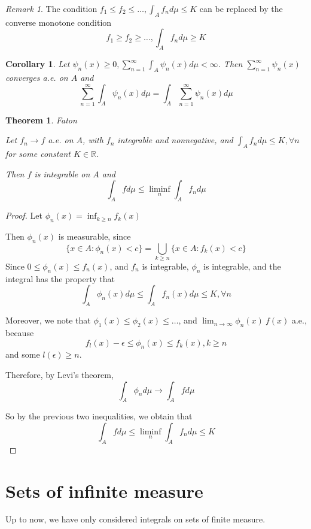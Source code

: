 \documentclass[11pt,a4paper]{report}
\newtheorem{corollary}[theorem]{Corollary}
\theoremstyle{plain}
\newtheorem{thm}{Theorem}[section]
\theoremstyle{definition}
\theoremstyle{remark}
\newtheorem*{rem}{Remark}
\newcommand{\Union}{\bigcup}
\newcommand{\R}{\mathbb{R}}
\begin{document}
\begin{rem}
    The condition $f_1 \le f_2 \le \dots, \int_A f_n d\mu \le K$ can be replaced by the converse monotone condition
    $$ f_1 \ge f_2 \ge \dots, \int_A f_n d\mu \ge K $$
\end{rem}

\begin{corollary}
    Let $\psi_n(x) \ge 0, \sum_{n=1}^\infty \int_A \psi_n(x) d\mu < \infty$.
    Then $\sum_{n=1}^\infty \psi_n(x)$ converges a.e. on $A$ and
    $$ \sum_{n=1}^\infty \int_A \psi_n(x) d\mu = \int_A \sum_{n=1}^\infty \psi_n(x) d\mu$$
\end{corollary}

\begin{thm}{Faton}

    Let $f_n \rightarrow f$ a.e. on $A$, with $f_n$ integrable and nonnegative, and $\int_A f_n d\mu \le K, \forall n$ for some constant $K \in \R$.

    Then $f$ is integrable on $A$ and
    $$ \int_A f d\mu \le {\liminf}_n \int_A f_n d\mu $$
\end{thm}

\begin{proof}
    Let $\phi_n(x) = \inf_{k \ge n} f_k(x)$

    Then $\phi_n(x)$ is measurable, since 
    $$\{ x \in A : \phi_n(x) < c \} = \Union_{k \ge n} \{ x \in A : f_k(x) < c \} $$
    Since $0 \le \phi_n(x) \le f_n(x)$, and $f_n$ is integrable, $\phi_n$ is integrable, and the integral has the property that 
    $$\int_A \phi_n(x) d\mu \le \int_A f_n(x) d\mu \le K, \forall n$$

    Moreover, we note that $\phi_1(x) \le \phi_2(x) \le \dots$, and $\lim_{n \rightarrow \infty} \phi_n(x) \ f(x)$ a.e., because
    $$ f_l(x) - \epsilon \le \phi_n(x) \le f_k(x), k \ge n $$
    and some $l(\epsilon) \ge n$.

    Therefore, by Levi's theorem,
    $$ \int_A \phi_n d\mu \rightarrow \int_A f d\mu $$

    So by the previous two inequalities, we obtain that
    $$ \int_A f d\mu \le {\liminf}_n \int_A f_n d\mu \le K $$
\end{proof}


\section{Sets of infinite measure}

Up to now, we have only considered integrals on sets of finite measure.
\end{document}
